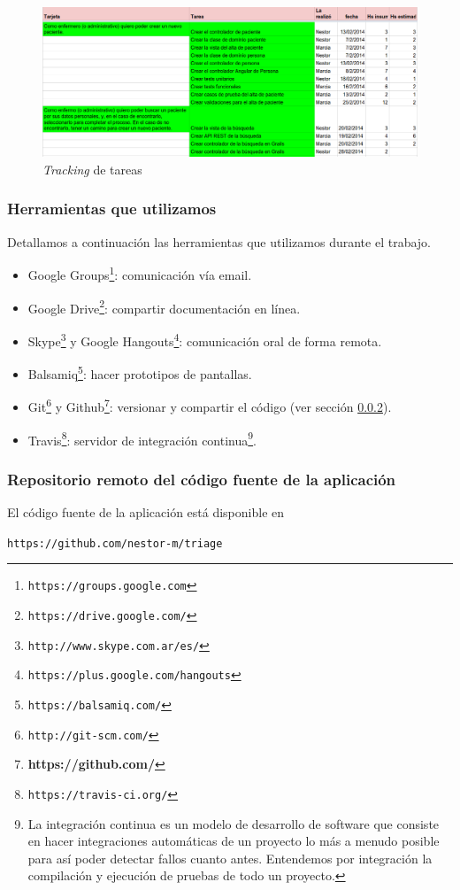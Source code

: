 \begin{figure}
  \centerline{\includegraphics[width=1.2\textwidth]{tracking.png}}
  \caption{\textit{Tracking} de tareas}
  \label{fig:tracking}
\end{figure}

\subsubsection{Herramientas que utilizamos}
Detallamos a continuación las herramientas que utilizamos durante el trabajo.
\begin{itemize}
\item Google Groups\footnote{\texttt{https://groups.google.com}}: comunicación vía email.
\item Google Drive\footnote{\texttt{https://drive.google.com/}}: compartir documentación en línea.
\item Skype\footnote{\texttt{http://www.skype.com.ar/es/}} y Google Hangouts\footnote{\texttt{https://plus.google.com/hangouts}}: comunicación oral de forma remota.
\item Balsamiq\footnote{\texttt{https://balsamiq.com/}}: hacer prototipos de pantallas.
\item Git\footnote{\texttt{http://git-scm.com/}} y Github\footnote{\textbf{https://github.com/}}: versionar y compartir el código (ver sección \ref{cap:repo}).
\item Travis\footnote{\texttt{https://travis-ci.org/}}: servidor de integración continua\footnote{La integración continua es un modelo de desarrollo de software que consiste en hacer integraciones automáticas de un proyecto lo más a menudo posible para así poder detectar fallos cuanto antes. Entendemos por integración la compilación y ejecución de pruebas de todo un proyecto.}.
\end{itemize}

\subsubsection{Repositorio remoto del código fuente de la aplicación}\label{cap:repo}
El código fuente de la aplicación está disponible en 
\begin{center}
\texttt{https://github.com/nestor-m/triage}
\end{center}

